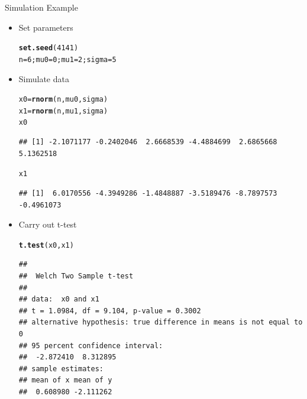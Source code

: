 \documentclass[xcolor=x11names,compress]{beamer}\usepackage[]{graphicx}\usepackage[]{color}
\makeatletter
\newcommand{\hlnum}[1]{\textcolor[rgb]{0.686,0.059,0.569}{#1}}%
\newcommand{\hlstd}[1]{\textcolor[rgb]{0.345,0.345,0.345}{#1}}%
\newcommand{\hlkwb}[1]{\textcolor[rgb]{0.69,0.353,0.396}{#1}}%
\newcommand{\hlkwd}[1]{\textcolor[rgb]{0.737,0.353,0.396}{\textbf{#1}}}%
\newenvironment{kframe}{%
 \def\at@end@of@kframe{}%
 \ifinner\ifhmode%
  \def\at@end@of@kframe{\end{minipage}}%
  \begin{minipage}{\columnwidth}%
 \fi\fi%
 \def\FrameCommand##1{\hskip\@totalleftmargin \hskip-\fboxsep
 \colorbox{shadecolor}{##1}\hskip-\fboxsep
     \hskip-\linewidth \hskip-\@totalleftmargin \hskip\columnwidth}%
 \MakeFramed {\advance\hsize-\width
   \@totalleftmargin\z@ \linewidth\hsize
   \@setminipage}}%
 {\par\unskip\endMakeFramed%
 \at@end@of@kframe}
\newenvironment{knitrout}{}{} %
\makeatother
\begin{document}
\begin{frame}[fragile]{Simulation Example}
   \begin{itemize}
     \item Set parameters
\begin{knitrout}\tiny
{}\color{fgcolor}\begin{kframe}
\begin{alltt}
\hlkwd{set.seed}\hlstd{(}\hlnum{4141}\hlstd{)}
\hlstd{n}\hlkwb{=}\hlnum{6}\hlstd{;mu0}\hlkwb{=}\hlnum{0}\hlstd{;mu1}\hlkwb{=}\hlnum{2}\hlstd{;sigma}\hlkwb{=}\hlnum{5}
\end{alltt}
\end{kframe}
\end{knitrout}
\item Simulate data
\begin{knitrout}\tiny
{}\color{fgcolor}\begin{kframe}
\begin{alltt}
\hlstd{x0}\hlkwb{=}\hlkwd{rnorm}\hlstd{(n,mu0,sigma)}
\hlstd{x1}\hlkwb{=}\hlkwd{rnorm}\hlstd{(n,mu1,sigma)}
\hlstd{x0}
\end{alltt}
\begin{verbatim}
## [1] -2.1071177 -0.2402046  2.6668539 -4.4884699  2.6865668  5.1362518
\end{verbatim}
\begin{alltt}
\hlstd{x1}
\end{alltt}
\begin{verbatim}
## [1]  6.0170556 -4.3949286 -1.4848887 -3.5189476 -8.7897573 -0.4961073
\end{verbatim}
\end{kframe}
\end{knitrout}
\item Carry out t-test
\begin{knitrout}\tiny
{}\color{fgcolor}\begin{kframe}
\begin{alltt}
\hlkwd{t.test}\hlstd{(x0,x1)}
\end{alltt}
\begin{verbatim}
## 
## 	Welch Two Sample t-test
## 
## data:  x0 and x1
## t = 1.0984, df = 9.104, p-value = 0.3002
## alternative hypothesis: true difference in means is not equal to 0
## 95 percent confidence interval:
##  -2.872410  8.312895
## sample estimates:
## mean of x mean of y 
##  0.608980 -2.111262
\end{verbatim}
\end{kframe}
\end{knitrout}
  \end{itemize}
\end{frame}
\end{document}
